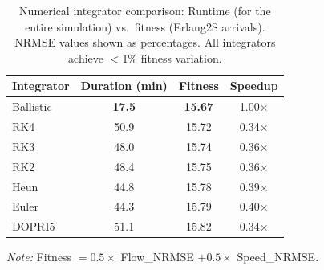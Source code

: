 \documentclass{scspaperproc}
\theoremstyle{scsthe}
\begin{document}
\begin{table}[H]
    \centering
    \begin{tabular}{lccc}
        \hline
        \textbf{Integrator} & \textbf{Duration (min)} & \textbf{Fitness} & \textbf{Speedup} \\
        \hline
        Ballistic & \textbf{17.5} & \textbf{15.67} & 1.00$\times$ \\
        RK4       & 50.9 & 15.72 & 0.34$\times$ \\
        RK3       & 48.0 & 15.74 & 0.36$\times$ \\
        RK2       & 48.4 & 15.75 & 0.36$\times$ \\
        Heun      & 44.8 & 15.78 & 0.39$\times$ \\
        Euler     & 44.3 & 15.79 & 0.40$\times$ \\
        DOPRI5    & 51.1 & 15.82 & 0.34$\times$ \\
        \hline
    \end{tabular}
    \begin{flushleft}
        \footnotesize
        \textit{Note:} Fitness $= 0.5 \times$ Flow\_NRMSE $+ 0.5 \times$ Speed\_NRMSE.
    \end{flushleft}
    \caption{Numerical integrator comparison: Runtime (for the entire simulation) vs.\ fitness (Erlang2S arrivals). NRMSE values shown as percentages. All integrators achieve $<$1\% fitness variation. }
     \label{tab:integrator-comparison}
\end{table}
\end{document}
